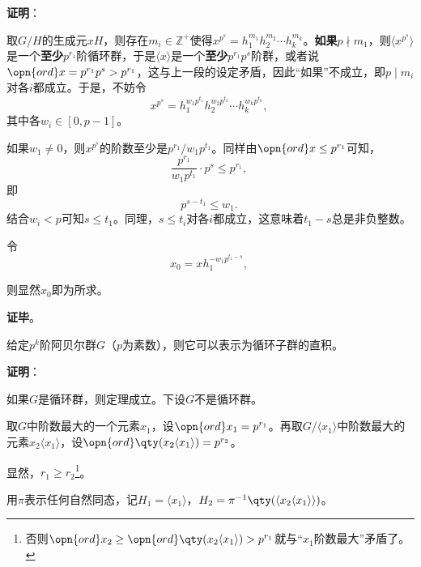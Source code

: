 \textbf{证明}：

取$G/H$的生成元$xH$，则存在$m_i\in \mathbb{Z}^+$使得$x^{p^s}=h_1^{m_1}h_2^{m_2}\cdots h_k^{m_k}$。\textbf{如果}$p\nmid m_1$，则$\langle x^{p^s} \rangle$是一个\textbf{至少}$p^{r_1}$阶循环群，于是$\langle x \rangle$是一个\textbf{至少}$p^{r_1}p^s$阶群，或者说$\opn{ord}x=p^{r_1}p^s>p^{r_1}$，这与上一段的设定矛盾，因此“如果”不成立，即$p\mid m_i$对各$i$都成立。于是，不妨令
\begin{equation}
    x^{p^s}=h_1^{w_1p^{t_1}}h_2^{w_2p^{t_2}}\cdots h_k^{w_kp^{t_k}}, ~
\end{equation}
其中各$w_i\in[0, p-1]$。

如果$w_1\not=0$，则$x^{p^s}$的阶数至少是$p^{r_1}/w_1p^{t_1}$。同样由$\opn{ord}x\leq p^{r_1}$可知，
\begin{equation}
    \frac{p^{r_1}}{w_1p^{t_1}}\cdot p^s\leq p^{r_1}, ~
\end{equation}
即
\begin{equation}
    p^{s-t_1}\leq w_1. ~
\end{equation}
结合$w_i<p$可知$s\leq t_1$。同理，$s\leq t_i$对各$i$都成立，这意味着$t_1-s$总是非负整数。

令
\begin{equation}
    x_0 = x h_1^{-w_1p^{t_1-s}}, ~
\end{equation}

则显然$x_0$即为所求。


\textbf{证毕}。



\begin{theorem}{}

给定$p^k$阶阿贝尔群$G$（$p$为素数），则它可以表示为循环子群的直积。

\end{theorem}


\textbf{证明}：

如果$G$是循环群，则定理成立。下设$G$不是循环群。

取$G$中阶数最大的一个元素$x_1$，设$\opn{ord}x_1=p^{r_1}$。再取$G/\langle x_1 \rangle$中阶数最大的元素$x_2\langle x_1 \rangle$，设$\opn{ord}\qty(x_2\langle x_1 \rangle) = p^{r_2}$。

显然，$r_1\geq r_2$\footnote{否则$\opn{ord}x_2\geq \opn{ord}\qty(x_2\langle x_1 \rangle)>p^{r_1}$就与“$x_1$阶数最大”矛盾了。}。

用$\pi$表示任何自然同态，记$H_1=\langle x_1 \rangle$，$H_2=\pi^{-1}\qty(\langle x_2\langle x_1 \rangle \rangle)$。



